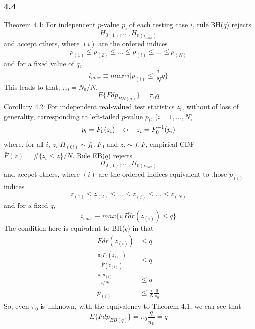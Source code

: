 \documentclass{article}\usepackage{graphicx, color}
\begin{document}
\subsubsection*{4.4}
Theorem 4.1: \newline
For independent $p$-value $p_i$ of each testing case $i$, rule BH($q$) rejects
\begin{displaymath}
H_{0(1)}, ... , H_{0(i_{max})}
\end{displaymath}
and accept others, where $(i)$ are the ordered indices
\begin{displaymath}
p_{(1)} \leq p_{(2)} \leq ... \leq p_{(i)} \leq ... \leq p_{(N)}
\end{displaymath}
and for a fixed value of $q$,
\begin{displaymath}
i_{max} \equiv max\{i | p_{(i)} \leq \frac{i}{N}q  \}
\end{displaymath}
This leads to that, $\pi_0 = N_0 / N$,
\begin{displaymath}
E\{ Fdp_{BH(q)} \} = \pi_0q
\end{displaymath}
Corollary 4.2:\newline
For independent real-valued test statistics $z_i$, without of loss of
generality, corresponding to left-tailed $p$-value $p_i$, ($i=1,...,N$)
\begin{displaymath}
p_i = F_0(z_i) \hspace{8 pt} \leftrightarrow \hspace{8 pt} z_i = F_0^{-1}(p_i)
\end{displaymath}
where, for all $i$, $z_i | H_{(0i)} \sim f_0, F_0$ and $z_i \sim f, F$, 
empirical CDF $\bar{F}(z) = \# \{z_i\leq z \}/N$.\newline
Rule EB($q$) rejects
\begin{displaymath}
H_{0(1)}, ... , H_{0(i_{max})}
\end{displaymath}
and accpet others, where $(i)$ are the ordered indices equivalent to those $p_{(i)}$ indices
\begin{displaymath}
z_{(1)} \leq z_{(2)} \leq ... \leq z_{(i)} \leq ... \leq z_{(N)}
\end{displaymath}
and for a fixed $q$,
\begin{displaymath}
i_{max} \equiv max\{ i | \overline{Fdr}(z_{(i)}) \leq q \}
\end{displaymath}
The condition here is equivalent to BH($q$) in that
\begin{displaymath}
\begin{split}
\overline{Fdr}(z_{(i)}) &\leq q \\
\frac{\pi_0F_0(z_{(i)})}{\bar{F}(z_{(i)})} &\leq q \\
\frac{\pi_0p_{(i)}}{i/N} &\leq q \\
p_{(i)} &\leq \frac{i}{N} \frac{q}{\pi_0}
\end{split}
\end{displaymath}
So, even $\pi_0$ is unknown, with the equivalency to Theorem
4.1, we can see that
\begin{displaymath}
E\{ Fdp_{EB(q)} \} = \pi_0 \frac{q}{\pi_0} = q
\end{displaymath}
\end{document}
